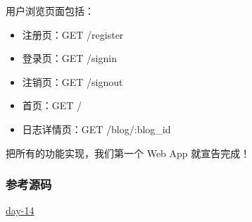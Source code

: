 用户浏览页面包括：

\begin{itemize}
\item
  注册页：GET /register
\item
  登录页：GET /signin
\item
  注销页：GET /signout
\item
  首页：GET /
\item
  日志详情页：GET /blog/:blog\_id
\end{itemize}

把所有的功能实现，我们第一个 Web App 就宣告完成！

\hypertarget{ux53c2ux8003ux6e90ux7801}{%
\subsubsection{参考源码}\label{ux53c2ux8003ux6e90ux7801}}

\href{https://github.com/michaelliao/awesome-python3-webapp/tree/day-14}{day-14}

